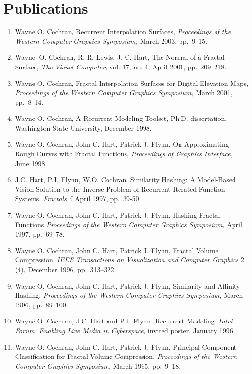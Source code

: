 \documentclass[10pt]{article}
\begin{document}
\section*{Publications}

\begin{enumerate}

\item Wayne O. Cochran,
Recurrent Interpolation Surfaces,
{\em Proceedings of the Western Computer Graphics Symposium,}
March 2003, pp.~9--15.

\item Wayne. O. Cochran, R. R. Lewis, J. C. Hart,
The Normal of a Fractal Surface,
{\em The Visual Computer,} vol. 17, no. 4, April 2001, pp.~209--218.

\item Wayne O. Cochran,
Fractal Interpolation Surfaces for Digital Elevation Maps,
{\em Proceedings of the Western Computer Graphics Symposium,}
March 2001, pp.~8--14.

\item Wayne O. Cochran,
A Recurrent Modeling Toolset, Ph.D. dissertation.
Washington State University, December 1998.

\item
Wayne O. Cochran, John C. Hart, Patrick J. Flynn,
On Approximating Rough Curves with Fractal Functions,
{\em Proceedings of Graphics Interface,}
June 1998.

\item
J.C. Hart, P.J. Flynn, W.O. Cochran. 
Similarity Hashing: A Model-Based Vision Solution to the Inverse 
Problem of Recurrent Iterated Function Systems. 
{\em Fractals 5} April 1997, pp.~39-50.

\item
Wayne O. Cochran, John C. Hart, Patrick J. Flynn,
Hashing Fractal Functions
{\em Proceedings of the Western Computer Graphics Symposium,}
April 1997, pp.~69--78.

\item
Wayne O. Cochran, John C. Hart, Patrick J. Flynn,
Fractal Volume Compression,
{\em IEEE Transactions on Visualization and Computer Graphics}
2 (4),
December 1996, pp.~313--322.

\item
Wayne O. Cochran, John C. Hart, Patrick J. Flynn,
Similarity and Affinity Hashing,
{\em Proceedings of the Western Computer Graphics Symposium,}
March 1996, pp.~89--100.

\item
Wayne O. Cochran, J.C. Hart and P.J. Flynn. Recurrent Modeling. 
{\em Intel Forum: Enabling Live Media in Cyberspace,} 
invited poster. January 1996.

\item
Wayne O. Cochran, John C. Hart, Patrick J. Flynn,
Principal Component Classification for Fractal Volume Compression,
{\em Proceedings of the Western Computer Graphics Symposium,}
March 1995, \mbox{pp.~9--18}.

\end{enumerate}
\end{document}

